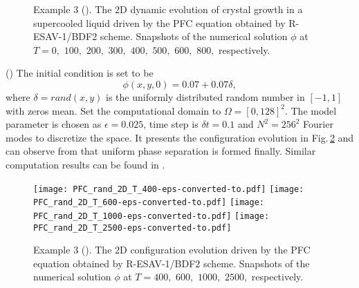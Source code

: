 \documentclass[final,review,onefignum,onetabnum]{siamart190516}
\theoremstyle{plain}
\begin{document}
\begin{figure}[htbp]
\centering
{} 
\label{Fig:PFC-2D-RESAV1}
\caption{Example 3 (). The $2$D dynamic evolution of crystal growth in a supercooled liquid driven by the PFC equation obtained by R-ESAV-1/BDF$2$ scheme. Snapshots of the numerical solution $\phi$ at $T=0,$ $100,$ $200,$ $300,$ $400,$ $500,$ $600,$ $800,$ respectively.}
\end{figure}

()  
The initial condition is set  to be
\begin{equation}
	\phi\left(x, y, 0\right)=0.07+0.07\delta,
\end{equation}
where $\delta=rand(x, y)$ is the uniformly distributed random number in $[-1, 1]$ with zeros mean.  Set the computational domain to $\Omega=[0, 128]^{2}$. 
The model parameter is chosen as $\epsilon=0.025$, time step is $\delta t=0.1$ and $N^{2}=256^{2}$ Fourier modes to discretize the space. 
It presents the configuration evolution in Fig.\,\ref{Fig:PFC-rand-2D-RESAV1}  and can observe from that uniform phase separation is formed finally. 
Similar computation results can be found in  \cite{liu2020exponential, liu2021highly}. 

\begin{figure}[htbp]
	\centering
		\hspace{-10mm}
		\texttt{[image: PFC\_rand\_2D\_T\_400-eps-converted-to.pdf]}	\hspace{-12mm}
		\texttt{[image: PFC\_rand\_2D\_T\_600-eps-converted-to.pdf]}	\hspace{-12mm}
		\texttt{[image: PFC\_rand\_2D\_T\_1000-eps-converted-to.pdf]}	\hspace{-12mm}
		\texttt{[image: PFC\_rand\_2D\_T\_2500-eps-converted-to.pdf]}\hspace{-12mm}
	\caption{Example 3 (). The $2$D configuration evolution driven by the PFC equation obtained by R-ESAV-1/BDF$2$ scheme. Snapshots of the numerical solution $\phi$ at $T=400,$ $600,$ $1000,$ $2500,$ respectively.}
	\label{Fig:PFC-rand-2D-RESAV1}
\end{figure}
\end{document}
